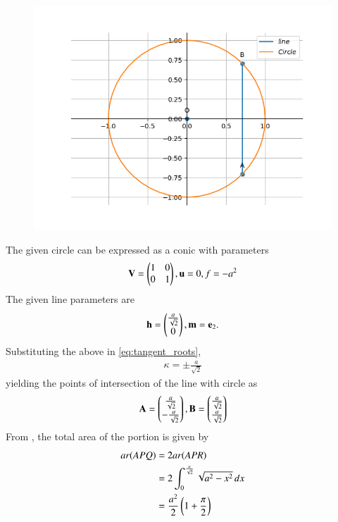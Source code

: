 	\begin{figure}[!h]
		\centering
 \includegraphics[width=\columnwidth]{chapters/12/8/1/7/figs/conic.png}
		\caption{}
		\label{fig:12/8/1/7}
  	\end{figure}
The given circle can be expressed as a conic with parameters
\begin{align}
\mathbf{V}=
\begin{pmatrix}
1 & 0\\
0 & 1
\end{pmatrix},
\mathbf{u}=0,
f=-a^2
\end{align} 
The given line 
parameters are
\begin{align} 
	\mathbf{h}=\begin{pmatrix}\frac{a}{\sqrt{2}} \\ 0\end{pmatrix},  \mathbf{m}=\mathbf{e}_2.
\end{align}
Substituting the above in
\eqref{eq:tangent_roots},
\begin{align}
    \kappa =\pm\frac{a}{\sqrt{2}}
\end{align}
yielding the
points of intersection of the line with circle as
\begin{align}
    \mathbf{A}=\begin{pmatrix}
\frac{a}{\sqrt{2}}\\
-\frac{a}{\sqrt{2}}
    \end{pmatrix},
    \mathbf{B}=\begin{pmatrix}
\frac{a}{\sqrt{2}}\\
\frac{a}{\sqrt{2}}
    \end{pmatrix}
\end{align}
 From 
		,
the total area of the portion is given by
\begin{align}
	ar( APQ)&=2 ar (APR)
	\\
&=2\int_{0}^{\frac{a}{\sqrt{2}}}\sqrt{a^2-x^2}\,dx 
	\\
	&=\frac{a^2}{2}\left(1+\frac{\pi}{2}\right)
\end{align}

